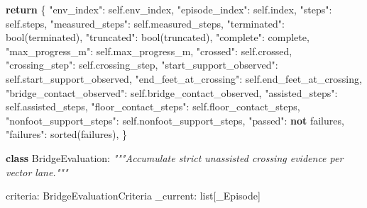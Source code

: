 \documentclass[
  american,
  11pt,
  letterpaper,
]{article}
\newenvironment{Shaded}{\begin{snugshade}}{\end{snugshade}}
\newcommand{\BuiltInTok}[1]{#1}
\newcommand{\CommentTok}[1]{\textcolor[rgb]{0.56,0.35,0.01}{\textit{#1}}}
\newcommand{\ControlFlowTok}[1]{\textcolor[rgb]{0.13,0.29,0.53}{\textbf{#1}}}
\newcommand{\KeywordTok}[1]{\textcolor[rgb]{0.13,0.29,0.53}{\textbf{#1}}}
\newcommand{\NormalTok}[1]{#1}
\newcommand{\StringTok}[1]{\textcolor[rgb]{0.31,0.60,0.02}{#1}}
\newcommand{\VariableTok}[1]{\textcolor[rgb]{0.00,0.00,0.00}{#1}}
\renewenvironment{Shaded}{\par\smallskip}{\par\smallskip}
\begin{document}
\begin{Shaded}
\begin{Highlighting}[]
        \ControlFlowTok{return}\NormalTok{ \{}
            \StringTok{"env\_index"}\NormalTok{: }\VariableTok{self}\NormalTok{.env\_index,}
            \StringTok{"episode\_index"}\NormalTok{: }\VariableTok{self}\NormalTok{.index,}
            \StringTok{"steps"}\NormalTok{: }\VariableTok{self}\NormalTok{.steps,}
            \StringTok{"measured\_steps"}\NormalTok{: }\VariableTok{self}\NormalTok{.measured\_steps,}
            \StringTok{"terminated"}\NormalTok{: }\BuiltInTok{bool}\NormalTok{(terminated),}
            \StringTok{"truncated"}\NormalTok{: }\BuiltInTok{bool}\NormalTok{(truncated),}
            \StringTok{"complete"}\NormalTok{: complete,}
            \StringTok{"max\_progress\_m"}\NormalTok{: }\VariableTok{self}\NormalTok{.max\_progress\_m,}
            \StringTok{"crossed"}\NormalTok{: }\VariableTok{self}\NormalTok{.crossed,}
            \StringTok{"crossing\_step"}\NormalTok{: }\VariableTok{self}\NormalTok{.crossing\_step,}
            \StringTok{"start\_support\_observed"}\NormalTok{: }\VariableTok{self}\NormalTok{.start\_support\_observed,}
            \StringTok{"end\_feet\_at\_crossing"}\NormalTok{: }\VariableTok{self}\NormalTok{.end\_feet\_at\_crossing,}
            \StringTok{"bridge\_contact\_observed"}\NormalTok{: }\VariableTok{self}\NormalTok{.bridge\_contact\_observed,}
            \StringTok{"assisted\_steps"}\NormalTok{: }\VariableTok{self}\NormalTok{.assisted\_steps,}
            \StringTok{"floor\_contact\_steps"}\NormalTok{: }\VariableTok{self}\NormalTok{.floor\_contact\_steps,}
            \StringTok{"nonfoot\_support\_steps"}\NormalTok{: }\VariableTok{self}\NormalTok{.nonfoot\_support\_steps,}
            \StringTok{"passed"}\NormalTok{: }\KeywordTok{not}\NormalTok{ failures,}
            \StringTok{"failures"}\NormalTok{: }\BuiltInTok{sorted}\NormalTok{(failures),}
\NormalTok{        \}}


\KeywordTok{class}\NormalTok{ BridgeEvaluation:}
    \CommentTok{"""Accumulate strict unassisted crossing evidence per vector lane."""}

\NormalTok{    criteria: BridgeEvaluationCriteria}
\NormalTok{    \_current: }\BuiltInTok{list}\NormalTok{[\_Episode]}


\end{Highlighting}
\end{Shaded}
\end{document}
